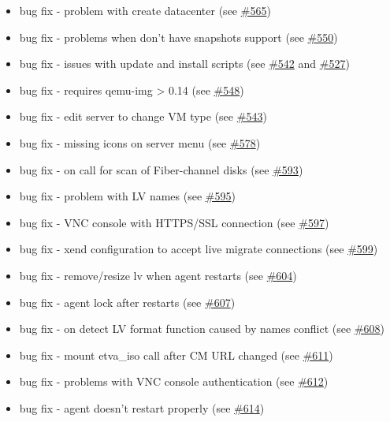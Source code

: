 \begin{itemize}
\item bug fix - problem with create datacenter (see \href{https://srcmaster.eurotux.com/pm/p/etva/ticket/565}{\#565})
\item bug fix - problems when don't have snapshots support (see \href{https://srcmaster.eurotux.com/pm/p/etva/ticket/550}{\#550})
\item bug fix - issues with update and install scripts (see \href{https://srcmaster.eurotux.com/pm/p/etva/ticket/542}{\#542} and \href{https://srcmaster.eurotux.com/pm/p/etva/ticket/527}{\#527})
\item bug fix - requires qemu-img > 0.14 (see \href{https://srcmaster.eurotux.com/pm/p/etva/ticket/548}{\#548})
\item bug fix - edit server to change VM type (see \href{https://srcmaster.eurotux.com/pm/p/etva/ticket/543}{\#543})
\item bug fix - missing icons on server menu (see \href{https://srcmaster.eurotux.com/pm/p/etva/ticket/578}{\#578})
\item bug fix - on call for scan of Fiber-channel disks (see \href{https://srcmaster.eurotux.com/pm/p/etva/ticket/593}{\#593})
\item bug fix - problem with LV names (see \href{https://srcmaster.eurotux.com/pm/p/etva/ticket/595}{\#595})
\item bug fix - VNC console with HTTPS/SSL connection (see \href{https://srcmaster.eurotux.com/pm/p/etva/ticket/597}{\#597})
\item bug fix - xend configuration to accept live migrate connections (see \href{https://srcmaster.eurotux.com/pm/p/etva/ticket/599}{\#599})
\item bug fix - remove/resize lv when agent restarts (see \href{https://srcmaster.eurotux.com/pm/p/etva/ticket/604}{\#604})
\item bug fix - agent lock after restarts (see \href{https://srcmaster.eurotux.com/pm/p/etva/ticket/607}{\#607})
\item bug fix - on detect LV format function caused by names conflict (see \href{https://srcmaster.eurotux.com/pm/p/etva/ticket/608}{\#608})
\item bug fix - mount etva\_iso call after CM URL changed (see \href{https://srcmaster.eurotux.com/pm/p/etva/ticket/611}{\#611})
\item bug fix - problems with VNC console authentication (see \href{https://srcmaster.eurotux.com/pm/p/etva/ticket/612}{\#612})
\item bug fix - agent doesn't restart properly (see \href{https://srcmaster.eurotux.com/pm/p/etva/ticket/614}{\#614})
\end{itemize}
